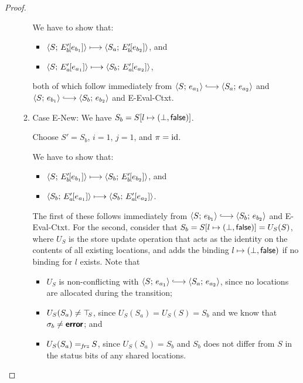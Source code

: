 \begin{proof}
\begin{enumerate}
\begin{enumerate}
      We have to show that:
      \begin{itemize}
      \item $\langle S;\, E'_b\hspace{-1mm}\left[e_{b_1}\right] \rangle \longmapsto
        \langle S_a;\, E'_b\hspace{-1mm}\left[e_{b_2}\right] \rangle$, and
      \item $\langle S;\, E'_a\hspace{-1mm}\left[e_{a_1}\right] \rangle \longmapsto
        \langle S_b;\, E'_a\hspace{-1mm}\left[e_{a_2}\right] \rangle$, 
      \end{itemize}

      both of which follow immediately from $\config{S}{e_{a_1}}
      \parstepsto \config{S_a}{e_{a_2}}$ and $\config{S}{e_{b_1}}
      \parstepsto \config{S_b}{e_{b_2}}$ and {\sc E-Eval-Ctxt}.

    \item \label{slqc-beta-new}Case {\sc E-New}: We have $S_b =
      S[l \mapsto (\bot, \textsf{false})]$.

      Choose $S' = S_b$, $i = 1$, $j = 1$, and $\pi = \mathrm{id}$.

      We have to show that:
      \begin{itemize}
      \item $\langle S;\, E'_b\hspace{-1mm}\left[e_{b_1}\right] \rangle \longmapsto
        \langle S_b;\, E'_b\hspace{-1mm}\left[e_{b_2}\right] \rangle$, and
      \item
        $\langle S_b;\, E'_a\hspace{-1mm}\left[e_{a_1}\right] \rangle \longmapsto
        \langle S_b;\, E'_a\hspace{-1mm}\left[e_{a_2}\right] \rangle$.
      \end{itemize}

      The first of these follows immediately from $\config{S}{e_{b_1}}
      \parstepsto \config{S_b}{e_{b_2}}$ and {\sc E-Eval-Ctxt}.  For
      the second, consider that $S_b = S[l \mapsto (\bot, \textsf{false})]
      = U_S(S)$, where $U_S$ is the store update operation that acts
      as the identity on the contents of all existing locations, and
      adds the binding $l \mapsto (\bot, \textsf{false})$ if no
      binding for $l$ exists.  Note that
      \begin{itemize}
      \item $U_S$ is non-conflicting with $\config{S}{e_{a_1}}
        \parstepsto \config{S_a}{e_{a_2}}$, since no locations are
        allocated during the transition;
        \item $U_S(S_a) \neq \top\hspace{-0.85mm}_{S}$, since $U_S(S_a) = U_S(S) = S_b$
          and we know that $\sigma_b \neq \textbf{\textsf{error}}$; and
        \item $U_S(S_a) =_{\textit{frz}} S$, since $U_S(S_a) = S_b$ and $S_b$
          does not differ from $S$ in the status bits of any shared
          locations.
      \end{itemize}


\end{enumerate}
\end{enumerate}
\end{proof}
